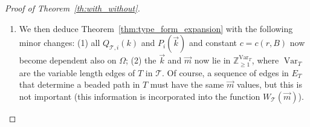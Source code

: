 \documentclass{memo-l}
\DeclareMathOperator{\Var}{Var}
\theoremstyle{plain}
\theoremstyle{definition}
\numberwithin{section}{chapter}
\numberwithin{equation}{chapter}
\newcommand{\integers}{{\mathbb Z}}
\theoremstyle{plain}
\theoremstyle{definition}
\newcommand\cT{\mathcal{T}}
\begin{document}
\begin{proof}[Proof of Theorem~\ref{th:with_without}]
\begin{enumerate}
Theorem~\ref{thm:walk_sum_expansion}); before considering the
$i_0,\ldots,i_k$, if the $i'_v$ are determined in any fixed order,
then their choice falls again into the categories
(1)--(3) of the proof of Theorem~\ref{thm:walk_sum_expansion}
(there is nothing about the classifications (1)--(3) that requires
successive $i'_v$ values to come from a (strictly non-backtracking closed)
walk in $G$).
Determining the $i'_v$ and $i_j$ involves a choice of 
$k+|V_\Omega|$ random variables, and hence we get the same
expansion theorem as in Theorem~\ref{thm:walk_sum_expansion},
except that the $k$ needs to be replaced with $k+|V_\Omega|$, which,
since $\Omega$ is fixed, means that we get the same bound,
except that the constant in the error bound \eqref{eq:error_bound_wse}
depends on $B$, $r$, and $\Omega$.
\item We then deduce
Theorem~\ref{thm:type_form_expansion} with the following minor changes:
(1) all $Q_{\cT,i}(k)$ and $P_i(\vec k)$ and constant $c=c(r,B)$
now become dependent also on $\Omega$;
(2) the $\vec k$ and $\vec m$ now lie in $\integers_{\ge 1}^{{\Var_T}}$,
where $\Var_T$ are the variable length edges of $T$ in $\cT$.
Of course, a sequence of edges in $E_T$ that determine a beaded
path in $T$ must have the same $\vec m$ values, but this is not
important (this information is
incorporated into the function $W_\cT(\vec m)$).
\end{enumerate}


\end{proof}
\end{document}

